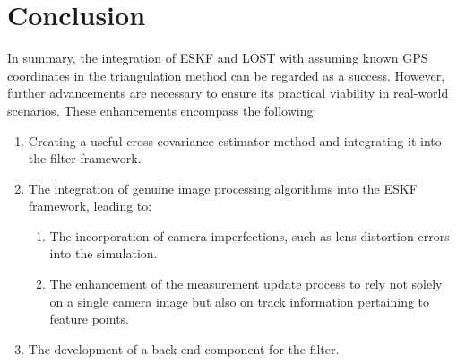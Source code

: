 \chapter{Conclusion}
\label{chap:conclusion}

In summary, the integration of ESKF and LOST with assuming known GPS coordinates in the triangulation method can be regarded as a success. However, further advancements are necessary to ensure its practical viability in real-world scenarios. These enhancements encompass the following:
\begin{enumerate}
    \item Creating a useful cross-covariance estimator method and integrating it into the filter framework.
    \item The integration of genuine image processing algorithms into the ESKF framework, leading to:
    \begin{enumerate}
        \item The incorporation of camera imperfections, such as lens distortion errors into the simulation.
        \item The enhancement of the measurement update process to rely not solely on a single camera image but also on track information pertaining to feature points.
    \end{enumerate}
    \item The development of a back-end component for the filter.
\end{enumerate}